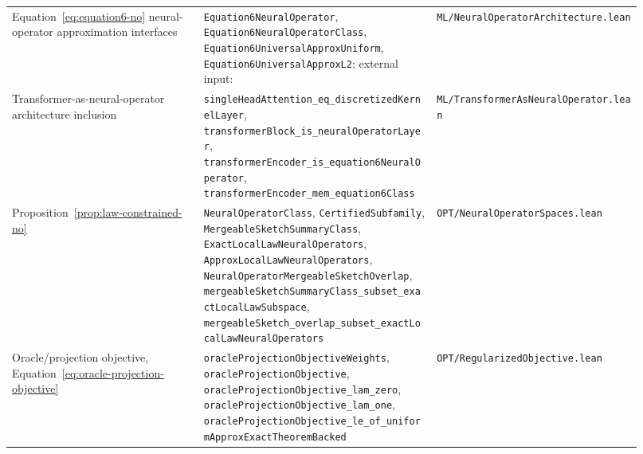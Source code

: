 \begin{table}[h]
\begin{tabular}{p{0.28\linewidth}p{0.34\linewidth}p{0.30\linewidth}}
Equation~\eqref{eq:equation6-no} neural-operator approximation interfaces &
\texttt{Equation6NeuralOperator}, \texttt{Equation6NeuralOperatorClass}, \texttt{Equation6UniversalApproxUniform}, \texttt{Equation6UniversalApproxL2}; external input: \citet[Theorems~11,13]{Kovachki23NeuralOperator} &
\texttt{ML/NeuralOperatorArchitecture.lean} \\

Transformer-as-neural-operator architecture inclusion &
\texttt{singleHeadAttention\_eq\_discretizedKernelLayer}, \texttt{transformerBlock\_is\_neuralOperatorLayer}, \texttt{transformerEncoder\_is\_equation6NeuralOperator}, \texttt{transformerEncoder\_mem\_equation6Class} &
\texttt{ML/TransformerAsNeuralOperator.lean} \\

Proposition~\ref{prop:law-constrained-no} &
\texttt{NeuralOperatorClass}, \texttt{CertifiedSubfamily}, \texttt{MergeableSketchSummaryClass}, \texttt{ExactLocalLawNeuralOperators}, \texttt{ApproxLocalLawNeuralOperators}, \texttt{NeuralOperatorMergeableSketchOverlap}, \texttt{mergeableSketchSummaryClass\_subset\_exactLocalLawSubspace}, \texttt{mergeableSketch\_overlap\_subset\_exactLocalLawNeuralOperators} &
\texttt{OPT/NeuralOperatorSpaces.lean} \\

Oracle/projection objective, Equation~\eqref{eq:oracle-projection-objective} &
\texttt{oracleProjectionObjectiveWeights}, \texttt{oracleProjectionObjective}, \texttt{oracleProjectionObjective\_lam\_zero}, \texttt{oracleProjectionObjective\_lam\_one}, \texttt{oracleProjectionObjective\_le\_of\_uniformApproxExactTheoremBacked} &
\texttt{OPT/RegularizedObjective.lean} \\


\end{tabular}
\end{table}
